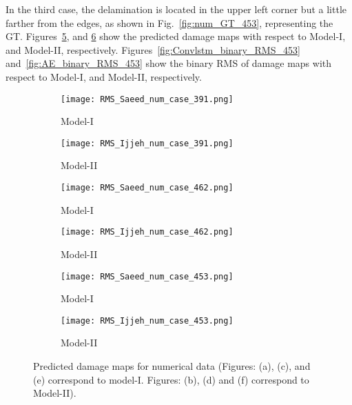 \begin{sloppypar}
	
	In the third case, the delamination is located in the upper left corner but a little farther from the edges, as shown in Fig.~\ref{fig:num_GT_453}, representing the GT. 
	Figures~\ref{fig:Convlstm_num_453}, and \ref{fig:AE_num_453} show the predicted damage maps with respect to Model-I, and Model-II, respectively.
	Figures~\ref{fig:Convlstm_binary_RMS_453} and~\ref{fig:AE_binary_RMS_453} show the binary RMS of damage maps with respect to Model-I, and Model-II, respectively.
	
	\begin{figure} [!ht]
		\centering
		\begin{subfigure}[b]{0.48\textwidth}
			\centering
			\texttt{[image: RMS\_Saeed\_num\_case\_391.png]} 
			\caption{Model-I}
			\label{fig:Convlstm_num_391}
		\end{subfigure}
		\hfill
		\begin{subfigure}[b]{0.48\textwidth}
			\centering
			\texttt{[image: RMS\_Ijjeh\_num\_case\_391.png]}
			\caption{Model-II}
			\label{fig:AE_num_391}
		\end{subfigure}
		\par\medskip
		\begin{subfigure}[b]{0.48\textwidth}
			\centering
			\texttt{[image: RMS\_Saeed\_num\_case\_462.png]}
			\caption{Model-I}
			\label{fig:Convlstm_num_462}
		\end{subfigure}
		\hfill
		\begin{subfigure}[b]{0.48\textwidth}
			\centering
			\texttt{[image: RMS\_Ijjeh\_num\_case\_462.png]}
			\caption{Model-II}
			\label{fig:AE_num_462}
		\end{subfigure}
		\par\medskip
		\begin{subfigure}[b]{0.48\textwidth}
			\centering
			\texttt{[image: RMS\_Saeed\_num\_case\_453.png]}
			\caption{Model-I}
			\label{fig:Convlstm_num_453}
		\end{subfigure}
		\hfill	
		\begin{subfigure}[b]{0.48\textwidth}
			\centering
			\texttt{[image: RMS\_Ijjeh\_num\_case\_453.png]}
			\caption{Model-II}
			\label{fig:AE_num_453}
		\end{subfigure}
		\caption{Predicted damage maps for numerical data (Figures: (a), (c), and (e) correspond to model-I. 
			Figures: (b), (d) and (f) correspond to Model-II).}
		\label{fig:num_case}
	\end{figure} 
	

\end{sloppypar}
